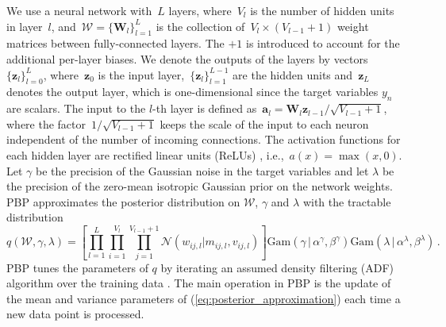 We use a neural network with~$L$ layers, where~$V_l$ is the number of hidden units in layer~$l$, and~${\mathcal{W} = \{ \mathbf{W}_l \}_{l=1}^L}$ is the collection of~${V_l\times (V_{l-1}+1)}$ weight matrices between fully-connected layers. The $+1$ is introduced to account for the additional per-layer biases. We denote the outputs of the layers by vectors~$\{ \mathbf{z}_l \}_{l=0}^{L}$, where~$\mathbf{z}_0$ is the input layer,~${\{\mathbf{z}_l\}_{l=1}^{L-1}}$ are the hidden units and~$\mathbf{z}_L$ denotes the output layer, which is one-dimensional since the target variables $y_n$ are scalars.   
The input to the $l$-th layer is defined as~${\mathbf{a}_l = \mathbf{W}_l \mathbf{z}_{l-1} / \sqrt{V_{l-1}+1} }$,
where the factor~${1/\sqrt{V_{l-1} + 1}}$ keeps the scale of the input to each neuron independent
of the number of incoming connections.
The activation functions for each hidden layer are rectified linear units (ReLUs)
\cite{nair2010rectified}, i.e.,~${a(x) = \max(x,0)}$.
Let $\gamma$ be the precision of the Gaussian noise in the target variables and let $\lambda$
be the precision of the zero-mean isotropic Gaussian prior on the network weights.
PBP approximates the posterior distribution on $\mathcal{W}$, $\gamma$ and $\lambda$ with
the tractable distribution
\begin{equation}
q(\mathcal{W},\gamma, \lambda) = \left[ \prod_{l=1}^L\! \prod_{i=1}^{V_l}\! 
\prod_{j=1}^{V_{l\!-\!1}\!+\!1} \mathcal{N}(w_{ij,l}| m_{ij,l},v_{ij,l})\right ]
 \text{Gam}(\gamma \,|\, \alpha^\gamma, \beta^\gamma)
\text{Gam}(\lambda \,|\, \alpha^\lambda, \beta^\lambda)\,.\label{eq:posterior_approximation}
\end{equation}
PBP tunes the parameters of $q$ by iterating an assumed
density filtering (ADF) algorithm over the training data \cite{opper1998bayesian}. The main operation in PBP
is the update of the mean and variance parameters of (\ref{eq:posterior_approximation})
each time a new data point is processed. 

